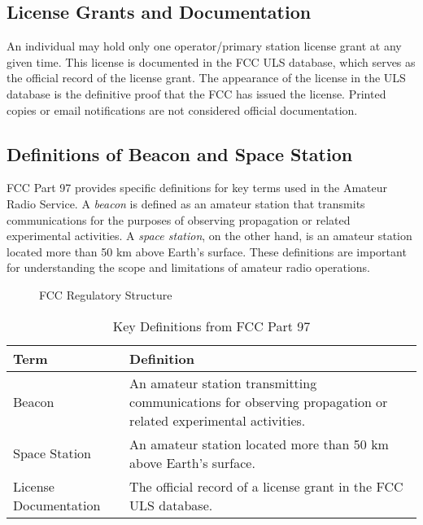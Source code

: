 \subsection*{License Grants and Documentation}
An individual may hold only one operator/primary station license grant at any given time. This license is documented in the FCC ULS database, which serves as the official record of the license grant. The appearance of the license in the ULS database is the definitive proof that the FCC has issued the license. Printed copies or email notifications are not considered official documentation.

\subsection*{Definitions of Beacon and Space Station}
FCC Part 97 provides specific definitions for key terms used in the Amateur Radio Service. A \textit{beacon} is defined as an amateur station that transmits communications for the purposes of observing propagation or related experimental activities. A \textit{space station}, on the other hand, is an amateur station located more than 50 km above Earth's surface. These definitions are important for understanding the scope and limitations of amateur radio operations.

\begin{figure}[h]
    \centering
    \caption{FCC Regulatory Structure}
    \label{fig:fcc_structure}
\end{figure}

\begin{table}[h]
    \centering
    \begin{tabular}{|l|l|}
        \hline
        \textbf{Term} & \textbf{Definition} \\
        \hline
        Beacon & An amateur station transmitting communications for observing propagation or related experimental activities. \\
        Space Station & An amateur station located more than 50 km above Earth's surface. \\
        License Documentation & The official record of a license grant in the FCC ULS database. \\
        \hline
    \end{tabular}
    \caption{Key Definitions from FCC Part 97}
    \label{tab:fcc_definitions}
\end{table}

